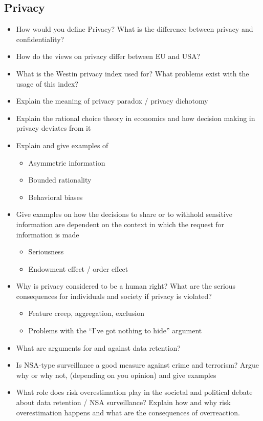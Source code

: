 \subsection{Privacy}
\begin{itemize}
	\item
		How would you define Privacy? What is the difference between privacy and confidentiality?
	\item
		How do the views on privacy differ between EU and USA?
	\item
		What is the Westin privacy index used for? What problems exist with the usage of this index?
	\item
		Explain the meaning of privacy paradox / privacy dichotomy
	\item
		Explain the rational choice theory in economics and how decision making  in privacy deviates from it
	\item
		Explain and give examples of
		\begin{itemize}
			\item
				Asymmetric information
			\item
				Bounded rationality
			\item
				Behavioral biases
		\end{itemize}
	\item
		Give examples on how the decisions to share or to withhold sensitive information are dependent on the context in which the request for information is made
		\begin{itemize}
			\item
				Seriousness
			\item
				Endowment effect / order effect
		\end{itemize}
	\item
		Why is privacy considered to be a human right? What are the serious consequences for individuals and society if privacy is violated?
		\begin{itemize}
			\item
				Feature creep, aggregation, exclusion
			\item
				Problems with the \enquote{I've got nothing to hide} argument
		\end{itemize}
	\item
		What are arguments for and against data retention?
	\item
		Is NSA-type surveillance a good measure against crime and terrorism? Argue why or why not, (depending on you opinion) and give examples
	\item
		What role does risk overestimation play in the societal and political debate about data retention / NSA surveillance? Explain how and why risk overestimation happens and what are the consequences of overreaction.
\end{itemize}
